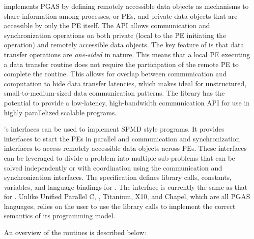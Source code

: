 \openshmem implements \ac{PGAS} by defining remotely accessible data objects as
mechanisms to share information among \openshmem processes, or \acp{PE}, and
private data objects that are accessible by only the \ac{PE} itself. The \ac{API}
allows communication and synchronization operations on both private (local to
the \ac{PE} initiating the operation) and remotely accessible data objects. The key
feature of \openshmem is that data transfer operations are
\emph{one-sided} in nature. This means that a local \ac{PE} executing
a data transfer routine does not require the participation of the remote \ac{PE}
to complete the routine. This allows for overlap between communication and
computation to hide data transfer latencies, which makes  \openshmem ideal for
unstructured, small-to-medium-sized data communication patterns. The \openshmem
library has the potential to provide a low-latency, high-bandwidth
communication \ac{API} for use in highly parallelized scalable programs.

\openshmem's interfaces can be used to implement \ac{SPMD} style programs.
It provides interfaces to start the \openshmem \acp{PE} in parallel and
communication and synchronization interfaces to access remotely accessible data
objects across \acp{PE}. These interfaces can be leveraged to divide a problem
into multiple sub-problems that can be solved independently or with coordination
using the communication and synchronization interfaces.  The \openshmem
specification defines library calls, constants, variables, and language bindings
for \Cstd.
The \Cpp interface is currently the same as that
for \Cstd. Unlike Unified Parallel C, \Fortran[2008], Titanium, X10, and Chapel, which are all
PGAS languages, \openshmem relies on the user to use the library calls  to
implement the correct semantics of its programming model.

An overview of the \openshmem routines is described below:

